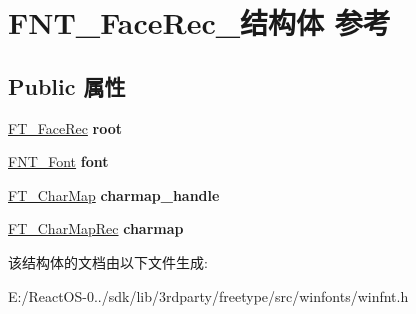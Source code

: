 \hypertarget{struct_f_n_t___face_rec__}{}\section{F\+N\+T\+\_\+\+Face\+Rec\+\_\+结构体 参考}
\label{struct_f_n_t___face_rec__}
\subsection*{Public 属性}
\begin{DoxyCompactItemize}
\item 
\mbox{\label{struct_f_n_t___face_rec___a88b68485291640b88ee2b92be5b15e33}} 
\hyperlink{struct_f_t___face_rec__}{F\+T\+\_\+\+Face\+Rec} {\bfseries root}
\item 
\mbox{\label{struct_f_n_t___face_rec___a082a4d95b48501401679a71abba61be6}} 
\hyperlink{struct_f_n_t___font_rec__}{F\+N\+T\+\_\+\+Font} {\bfseries font}
\item 
\mbox{\label{struct_f_n_t___face_rec___acf50d9a81fb2628587eaa357e9e26e5b}} 
\hyperlink{struct_f_t___char_map_rec__}{F\+T\+\_\+\+Char\+Map} {\bfseries charmap\+\_\+handle}
\item 
\mbox{\label{struct_f_n_t___face_rec___a1fa945a0394c8236ce9b41e01eefc5bf}} 
\hyperlink{struct_f_t___char_map_rec__}{F\+T\+\_\+\+Char\+Map\+Rec} {\bfseries charmap}
\end{DoxyCompactItemize}


该结构体的文档由以下文件生成\+:\begin{DoxyCompactItemize}
\item 
E\+:/\+React\+O\+S-\/0../sdk/lib/3rdparty/freetype/src/winfonts/winfnt.\+h\end{DoxyCompactItemize}
